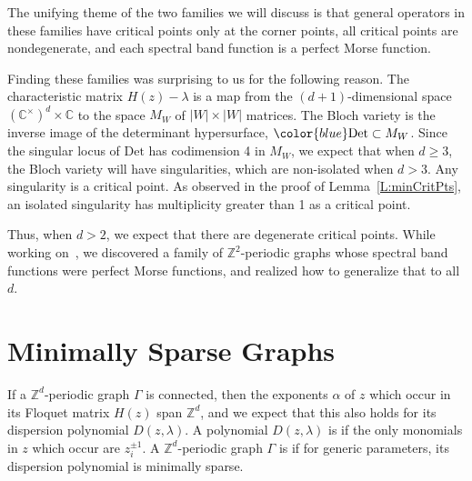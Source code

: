 \documentclass[12pt]{amsart}
\theoremstyle{remark}
\newcommand{\CC}{{\mathbb C}}
\newcommand{\ZZ}{{\mathbb Z}}
\newcommand{\defcolor}[1]{{\color{blue}#1}}
\newcommand{\demph}[1]{\defcolor{{\sl #1}}}
\begin{document}
The unifying theme of the two families we will discuss is that general operators in these families
have critical points only at the corner points, all critical points are nondegenerate, and 
each spectral band function is a perfect Morse function.

Finding these families was surprising to us for the following reason.
The characteristic matrix $H(z)-\lambda$ is a map from the
$(d{+}1)$-dimensional space $(\CC^\times)^d\times\CC$ to the space \defcolor{$M_W$} of $|W|\times|W|$ matrices.
The Bloch variety is the inverse image of the determinant hypersurface, $\defcolor{\mbox{Det}}\subset M_W$.
Since the singular locus of $\mbox{Det}$ has codimension 4 in $M_W$, we expect that when $d\geq 3$, the Bloch variety will
have singularities,  which are non-isolated when $d>3$.
Any singularity is a critical point.
As observed in the proof of Lemma~\ref{L:minCritPts}, an isolated singularity
has multiplicity greater than 1 as a critical point.

Thus, when $d>2$, we expect that there are degenerate critical points.
While working on~\cite{FRS2025}, we discovered a family of $\ZZ^2$-periodic graphs whose spectral band functions were
perfect Morse functions, and realized how to generalize that to all $d$.



\section{Minimally Sparse Graphs}\label{S:Sparse}

If a $\ZZ^d$-periodic graph $\Gamma$ is connected, then the exponents $\alpha$ of $z$ which occur in its Floquet matrix $H(z)$
span $\ZZ^d$, and we expect that this also holds for its dispersion polynomial $D(z,\lambda)$.
A polynomial $D(z,\lambda)$ is \demph{minimally sparse} if the only monomials in $z$ which occur are $z_i^{\pm1}$.
A $\ZZ^d$-periodic graph $\Gamma$ is \demph{minimally sparse} if for generic parameters, its dispersion  polynomial
is minimally sparse.
\end{document}
